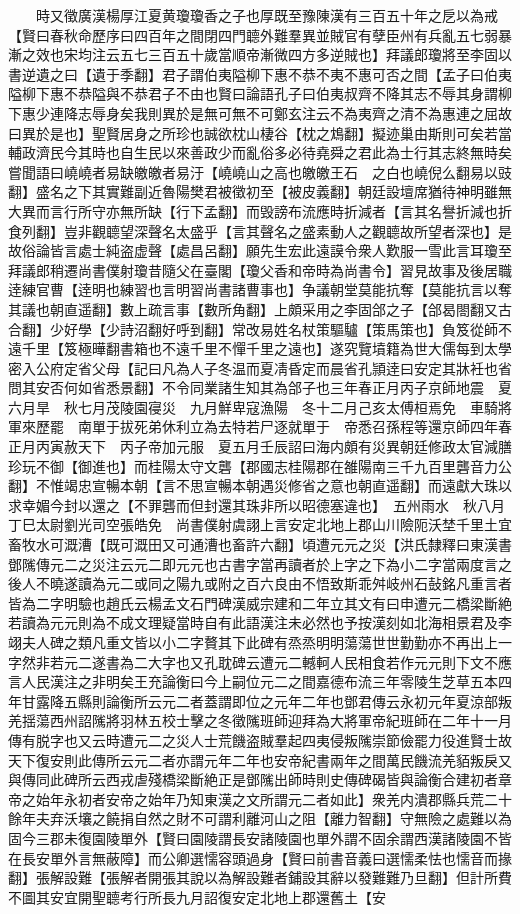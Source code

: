　　時又徵廣漢楊厚江夏黄瓊瓊香之子也厚既至豫陳漢有三百五十年之戹以為戒【賢曰春秋命歷序曰四百年之間閉四門聼外難羣異並賊官有孽臣州有兵亂五七弱暴漸之效也宋均注云五七三百五十歲當順帝漸微四方多逆賊也】拜議郎瓊將至李固以書逆遺之曰【遺于季翻】君子謂伯夷隘柳下惠不恭不夷不惠可否之間【孟子曰伯夷隘柳下惠不恭隘與不恭君子不由也賢曰論語孔子曰伯夷叔齊不降其志不辱其身謂柳下惠少連降志辱身矣我則異於是無可無不可鄭玄注云不為夷齊之清不為惠連之屈故曰異於是也】聖賢居身之所珍也誠欲枕山棲谷【枕之鴆翻】擬迹巢由斯則可矣若當輔政濟民今其時也自生民以來善政少而亂俗多必待堯舜之君此為士行其志終無時矣嘗聞語曰嶢嶢者易缺皦皦者易汙【嶢嶢山之高也皦皦王石　之白也嶢倪么翻易以豉翻】盛名之下其實難副近魯陽樊君被徵初至【被皮義翻】朝廷設壇席猶待神明雖無大異而言行所守亦無所缺【行下孟翻】而毁謗布流應時折減者【言其名譽折減也折食列翻】豈非觀聼望深聲名太盛乎【言其聲名之盛素動人之觀聼故所望者深也】是故俗論皆言處士純盗虚聲【處昌呂翻】願先生宏此遠謨令衆人歎服一雪此言耳瓊至拜議郎稍遷尚書僕射瓊昔隨父在臺閣【瓊父香和帝時為尚書令】習見故事及後居職逹練官曹【逹明也練習也言明習尚書諸曹事也】争議朝堂莫能抗奪【莫能抗言以奪其議也朝直遥翻】數上疏言事【數所角翻】上頗采用之李固郃之子【郃曷閤翻又古合翻】少好學【少詩沼翻好呼到翻】常改易姓名杖策驅驢【策馬策也】負笈從師不遠千里【笈極曄翻書箱也不遠千里不憚千里之遠也】遂究覽墳籍為世大儒每到太學密入公府定省父母【記曰凡為人子冬温而夏凊昏定而晨省孔頴逹曰安定其牀衽也省問其安否何如省悉景翻】不令同業諸生知其為郃子也三年春正月丙子京師地震　夏六月旱　秋七月茂陵園寑災　九月鮮卑寇漁陽　冬十二月己亥太傅桓焉免　車騎將軍來歷罷　南單于拔死弟休利立為去特若尸逐就單于　帝悉召孫程等還京師四年春正月丙寅赦天下　丙子帝加元服　夏五月壬辰詔曰海内頗有災異朝廷修政太官減膳珍玩不御【御進也】而桂陽太守文礱【郡國志桂陽郡在雒陽南三千九百里礱音力公翻】不惟竭忠宣暢本朝【言不思宣暢本朝遇災修省之意也朝直遥翻】而遠獻大珠以求幸媚今封以還之【不罪礱而但封還其珠非所以昭德塞違也】　五州雨水　秋八月丁巳太尉劉光司空張皓免　尚書僕射虞詡上言安定北地上郡山川險阨沃埜千里土宜畜牧水可溉漕【既可溉田又可通漕也畜許六翻】頃遭元元之災【洪氏隸釋曰東漢書鄧隲傳元二之災注云元二即元元也古書字當再讀者於上字之下為小二字當兩度言之後人不曉遂讀為元二或同之陽九或附之百六良由不悟致斯乖舛岐州石鼔銘凡重言者皆為二字明驗也趙氏云楊孟文石門碑漢威宗建和二年立其文有曰申遭元二橋梁斷絶若讀為元元則為不成文理疑當時自有此語漢注未必然也予按漢刻如北海相景君及李翊夫人碑之類凡重文皆以小二字贅其下此碑有烝烝明明蕩蕩世世勤勤亦不再出上一字然非若元二遂書為二大字也又孔耽碑云遭元二轗軻人民相食若作元元則下文不應言人民漢注之非明矣王充論衡曰今上嗣位元二之間嘉德布流三年零陵生芝草五本四年甘露降五縣則論衡所云元二者蓋謂即位之元年二年也鄧君傳云永初元年夏涼部叛羌揺蕩西州詔隲將羽林五校士擊之冬徵隲班師迎拜為大將軍帝紀班師在二年十一月傳有脱字也又云時遭元二之災人士荒饑盗賊羣起四夷侵叛隲崇節儉罷力役進賢士故天下復安則此傳所云元二者亦謂元年二年也安帝紀書兩年之間萬民饑流羌貊叛戾又與傳同此碑所云西戎虐殘橋梁斷絶正是鄧隲出師時則史傳碑碣皆與論衡合建初者章帝之始年永初者安帝之始年乃知東漢之文所謂元二者如此】衆羌内潰郡縣兵荒二十餘年夫弃沃壤之饒捐自然之財不可謂利離河山之阻【離力智翻】守無險之處難以為固今三郡未復園陵單外【賢曰園陵謂長安諸陵園也單外謂不固余謂西漢諸陵園不皆在長安單外言無蔽障】而公卿選懦容頭過身【賢曰前書音義曰選懦柔怯也懦音而掾翻】張解設難【張解者開張其說以為解設難者鋪設其辭以發難難乃旦翻】但計所費不圖其安宜開聖聼考行所長九月詔復安定北地上郡還舊土【安